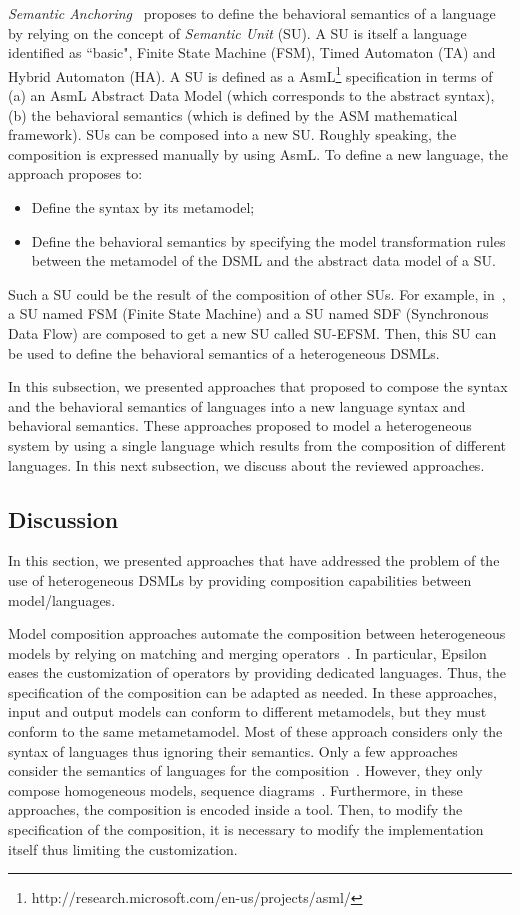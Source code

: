 \emph{Semantic Anchoring}~\cite{semanticsanchoring} proposes to define the behavioral semantics of a language by relying on the concept of \emph{Semantic Unit} (SU). A SU is itself a language identified as ``basic", \eg Finite State Machine (FSM), Timed Automaton (TA) and Hybrid Automaton (HA). A SU is defined as a AsmL\footnote{http://research.microsoft.com/en-us/projects/asml/} specification in terms of (a) an AsmL Abstract Data Model (which corresponds to the abstract syntax), (b) the behavioral semantics (which is defined by the ASM mathematical framework).  SUs can be composed into a new SU. Roughly speaking, the composition is expressed manually by using AsmL. To define a new language, the approach proposes to:
\begin{itemize}
	\item Define the syntax by its metamodel; 
	\item Define the behavioral semantics by specifying the model transformation rules between the metamodel of the DSML and the abstract data model of a SU.   
\end{itemize}
Such a SU could be the result of the composition of other SUs. For example, in~\cite{composemanticanch}, a SU named FSM (Finite State Machine) and a SU named SDF (Synchronous Data Flow) are composed to get a new SU called SU-EFSM. Then, this SU can be used to define the behavioral semantics of a heterogeneous DSMLs.

In this subsection, we presented approaches that proposed to compose the syntax and the behavioral semantics of languages into a new language syntax and behavioral semantics. These approaches proposed to model a heterogeneous system by using a single language which results from the composition of different languages. In this next subsection, we discuss about the reviewed approaches.

\subsection{Discussion}
In this section, we presented approaches that have addressed the problem of the use of heterogeneous DSMLs by providing composition capabilities between model/languages.

Model composition approaches automate the composition between heterogeneous models by relying on matching and merging operators~\cite{mergemanifest,epsilon,kompose}. In particular, Epsilon~\cite{epsilon} eases the customization of operators by providing dedicated languages. Thus, the specification of the composition can be adapted as needed. In these approaches, input and output models can conform to different metamodels, but they must conform to the same metametamodel. Most of these approach considers only the syntax of languages thus ignoring their semantics. Only a few approaches consider the semantics of languages for the composition~\cite{sequenceweavingbib,rambib,composdbib}. However, they only compose homogeneous models, \ie sequence diagrams~\cite{rambib}. Furthermore, in these approaches, the composition is encoded inside a tool. Then, to modify the specification of the composition, it is necessary to modify the implementation itself thus limiting the customization. 

